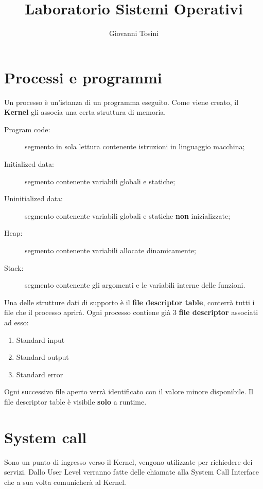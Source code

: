 \documentclass[a4paper, 12pt]{book}
\title{Laboratorio Sistemi Operativi}
\author{Giovanni Tosini}
\date{}
\begin{document}
    \begin{titlepage}
        \maketitle
    \end{titlepage}

    \frontmatter
    \tableofcontents
    \mainmatter

    \chapter{Processi e programmi}

    Un processo è un'istanza di un programma eseguito.
    Come viene creato, il \textbf{Kernel} gli associa
    una certa struttura di memoria.
    \begin{description}
        \item[Program code:] segmento in sola lettura  contenente istruzioni in linguaggio macchina;
        \item[Initialized data:] segmento contenente variabili globali e statiche;
        \item[Uninitialized data:] segmento contenente variabili globali e statiche \textbf{non} inizializzate;
        \item[Heap:] segmento contenente variabili allocate dinamicamente;
        \item[Stack:] segmento contenente gli argomenti e le variabili interne delle funzioni.    
    \end{description}
    Una delle strutture dati di supporto è il \textbf{file
    descriptor table}, conterrà tutti i file che il 
    processo aprirà. Ogni processo contiene già 3 
    \textbf{file descriptor} associati ad esso:
    \begin{enumerate}
        \item Standard input
        \item Standard output
        \item Standard error
    \end{enumerate}
    Ogni successivo file aperto verrà identificato con 
    il valore minore disponibile. Il file descriptor
    table è visibile \textbf{solo} a runtime.

    \chapter{System call}

    Sono un punto di ingresso verso il Kernel, vengono 
    utilizzate per richiedere dei servizi. Dallo User Level 
    verranno fatte delle chiamate alla System Call 
    Interface che a sua volta comunicherà al Kernel.
\end{document}
